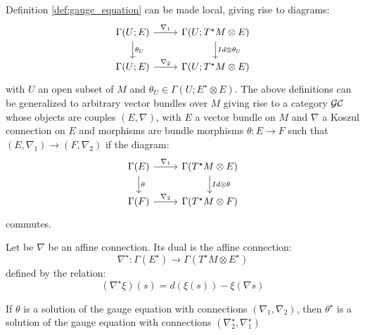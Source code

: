  Definition \ref{def:gauge_equation} can be made local, giving rise
 to diagrams:
 \begin{equation}
     \label{eq:eq_local_gauge_diagram}
     \begin{tikzcd}
     \Gamma\left(U; E \right) \ar[r, "\nabla_1"] \ar[d,"\theta_U"] & \Gamma\left( U; T^\star M \otimes E\right) \ar[d,"Id \otimes \theta_U"] \\
      \Gamma\left(U; E \right) \ar[r,"\nabla_2"] & \Gamma\left( U; T^\star M \otimes E\right)
     \end{tikzcd}
 \end{equation}
 with $U$ an open subset of $M$ and $\theta_U \in \Gamma \left(
 U; E^\star \otimes E 
 \right).$
 The above definitions can be generalized to arbitrary vector bundles over $M$ giving rise to a category $\mathcal{GC}$ whose objects are couples $(E,\nabla)$, with $E$ a vector bundle on $M$ and $\nabla$ a Koszul connection on $E$ and morphisms are bundle morphisms $\theta \colon E \to F$ such that $(E, \nabla_1) \to (F, \nabla_2)$ if the diagram:
   \begin{equation}
        \label{eq:gauge_morphism}
         \begin{tikzcd}
     \Gamma\left( E \right) \ar[r, "\nabla_1"] \ar[d,"\theta"] & \Gamma\left( T^\star M \otimes E\right) \ar[d,"Id \otimes \theta"] \\
      \Gamma\left(F \right) \ar[r,"\nabla_2"] & \Gamma\left( T^\star M \otimes F\right)
     \end{tikzcd}
    \end{equation}
 commutes.
 \begin{defn}
 \label{def:dual_connection}
 Let be $\nabla$ be an affine connection. Its dual is the affine connection:
 \begin{equation}
     \label{eq:dual_connection}
     \nabla^\star \colon  \Gamma(E^\star) \to \Gamma\left( T^\star M \otimes E^\star \right)
 \end{equation}
 defined by the relation:
 \begin{equation}
     \label{eq:nabla_duality_relation}
     \left( \nabla^\star \xi \right)\left(s\right) = 
     d(\xi(s)) - \xi\left(\nabla s\right)
 \end{equation}
 \end{defn}
 \begin{prop}
 \label{prop:dual_gauge}
 If $\theta$ is a solution of the gauge equation with connections $\left(\nabla_1, \nabla_2\right)$, then 
 $\theta^\star$ is a solution of the gauge equation with connections $\left(\nabla_2^\star, \nabla_1^\star\right)$
 \end{prop}
